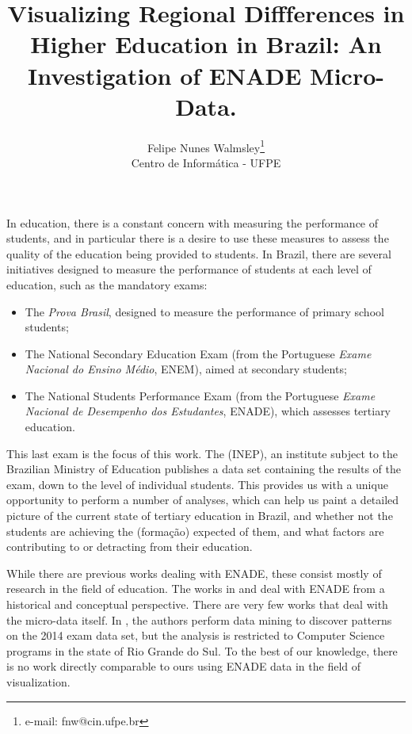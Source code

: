 \documentclass{vgtc}                          %
\title{Visualizing Regional Diffferences in Higher Education in Brazil: An Investigation of ENADE Micro-Data.}
\author{Felipe Nunes Walmsley\thanks{e-mail: fnw@cin.ufpe.br}\\ %
        \scriptsize Centro de Informática - UFPE %
}
\begin{document}




\maketitle

In education, there is a constant concern with measuring the performance of students, and in particular there is a desire to use these measures to assess the quality of the education being provided to students. In Brazil, there are several initiatives designed to measure the performance of students at each level of education, such as the mandatory exams:

\begin{itemize}
	\item{The \emph{Prova Brasil}, designed to measure the performance of primary school students;}
	\item{The National Secondary Education Exam (from the Portuguese \emph{Exame Nacional do Ensino Médio}, ENEM), aimed at secondary students;}
	\item{The National Students Performance Exam (from the Portuguese \emph{Exame Nacional de Desempenho dos Estudantes}, ENADE), which assesses tertiary education.}
\end{itemize}

This last exam is the focus of this work. The (INEP), an institute subject to the Brazilian Ministry of Education publishes a data set containing the results of the exam, down to the level of individual students. This provides us with a unique opportunity to perform a number of analyses, which can help us paint a detailed picture of the current state of tertiary education in Brazil, and whether not the students are achieving the (formação) expected of them, and what factors are contributing to or detracting from their education. 

While there are previous works dealing with ENADE, these consist mostly of research in the field of education. The works in \cite{brito2008sinaes} and \cite{verhine2006provao} deal with ENADE from a historical and conceptual perspective. There are very few works that deal with the micro-data itself. In \cite{vista2017tecnicas
}, the authors perform data mining to discover patterns on the 2014 exam data set, but the analysis is restricted to Computer Science programs in the state of Rio Grande do Sul. To the best of our knowledge, there is no work directly comparable to ours using ENADE data in the field of visualization. 
\end{document}
